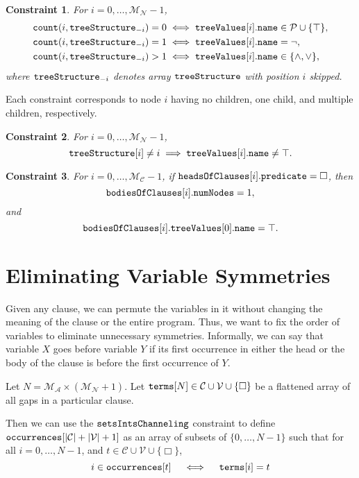 \documentclass[runningheads]{llncs}
\newtheorem{constraint}{Constraint}
\newcommand{\variable}[1]{\texttt{\textup{#1}}}
\newcommand{\predicates}{\mathcal{P}}
\newcommand{\variables}{\mathcal{V}}
\newcommand{\constants}{\mathcal{C}}
\newcommand{\maxArity}{\mathcal{M}_{\mathcal{A}}}
\newcommand{\maxNumNodes}{\mathcal{M}_{\mathcal{N}}}
\newcommand{\maxNumClauses}{\mathcal{M}_{\mathcal{C}}}
\begin{document}
\begin{constraint}
  For $i = 0, \dots, \maxNumNodes{} - 1$,
  \begin{align*}
    \variable{count}(i, \variable{treeStructure}_{-i}) = 0 &\iff \variable{treeValues}[i].\variable{name} \in \predicates{} \cup \{ \top \},\\
    \variable{count}(i, \variable{treeStructure}_{-i}) = 1 &\iff \variable{treeValues}[i].\variable{name} = \neg,\\
    \variable{count}(i, \variable{treeStructure}_{-i}) > 1 &\iff \variable{treeValues}[i].\variable{name} \in \{ \land, \lor \},
  \end{align*}
  where $\variable{treeStructure}_{-i}$ denotes array $\variable{treeStructure}$
  with position $i$ skipped.
\end{constraint}
Each constraint corresponds to node $i$ having no children, one child, and
multiple children, respectively.


\begin{constraint}
  For $i = 0, \dots, \maxNumNodes{} - 1$,
  \[
    \variable{treeStructure}[i] \ne i \implies
    \variable{treeValues}[i].\variable{name} \ne \top.
  \]
\end{constraint}

\begin{constraint}
  For $i = 0, \dots, \maxNumClauses{} - 1$, if
  $\variable{headsOfClauses}[i].\variable{predicate} = \Box$, then
  \[
    \variable{bodiesOfClauses}[i].\variable{numNodes} = 1,
  \]
  and
  \[
    \variable{bodiesOfClauses}[i].\variable{treeValues}[0].\variable{name} =
    \top.
  \]
\end{constraint}

\section{Eliminating Variable Symmetries} \label{sec:variable_symmetry}

Given any clause, we can permute the variables in it without changing the
meaning of the clause or the entire program. Thus, we want to fix the order of
variables to eliminate unnecessary symmetries. Informally, we can say that
variable $X$ goes before variable $Y$ if its first occurrence in either the head
or the body of the clause is before the first occurrence of $Y$.

\begin{definition}
  Let $N = \maxArity{} \times (\maxNumNodes{} + 1)$. Let
  $\variable{terms}[N] \in \constants{} \cup \variables{} \cup \{ \Box
  \}$ be a flattened array of all gaps in a particular clause.

  Then we can use the $\variable{setsIntsChanneling}$ constraint
  to define $\variable{occurrences}[|\constants{}| + |\variables{}| + 1]$ as an
  array of subsets of $\{ 0, \dots, N-1 \}$ such that for all $i = 0, \dots, N
  - 1$, and $t \in \constants{} \cup \variables{} \cup \{ \Box \}$,
  \[
    i \in \variable{occurrences}[t] \quad \iff \quad
    \variable{terms}[i] = t
  \]
\end{definition}
\end{document}
